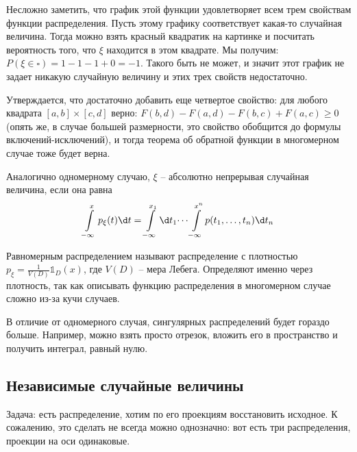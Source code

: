 
Несложно заметить, что график этой функции удовлетворяет всем трем свойствам функции распределения. Пусть этому графику соответствует какая-то случайная величина.
Тогда можно взять красный квадратик на картинке и посчитать вероятность того, что $\xi$ находится в этом квадрате. Мы получим: $P(\xi \in \square) = 1 - 1 - 1 + 0 = -1$. 
Такого быть не может, и значит этот график не задает никакую случайную величину и этих трех свойств недостаточно.

Утверждается, что достаточно добавить еще четвертое свойство: для любого квадрата $[a, b] \times [c, d]$ верно: $F(b, d) - F(a, d) - F(b, c) + F(a, c) \geq 0$ 
(опять же, в случае большей размерности, это свойство обобщится до формулы включений-исключений), и тогда теорема об обратной функции в многомерном случае тоже будет верна.

Аналогично одномерному случаю, $\xi$ -- абсолютно непрерывая случайная величина, если она равна 
$$\int\limits_{-\infty}^x p_{\xi}(t)\d t = \int\limits_{-\infty}^{x_1} \d t_1 \dots \int\limits_{-\infty}^{x^n} p(t_1, \dots, t_n) \d t_n$$

Равномерным распределением называют распределение с плотностью $p_{\xi} = \frac{1}{V(D)} \mathbb{1}_D(x)$, где $V(D)$ -- мера Лебега.
Определяют именно через плотность, так как описывать функцию распределения в многомерном случае сложно из-за кучи случаев.

В отличие от одномерного случая, сингулярных распределений будет гораздо больше. Например, можно взять просто отрезок, вложить его в пространство и получить интеграл, равный нулю.

\subsection{Независимые случайные величины}
Задача: есть распределение, хотим по его проекциям восстановить исходное. К сожалению, это сделать не всегда можно однозначно: вот есть три распределения, проекции на оси одинаковые.

